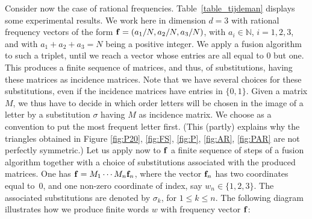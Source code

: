 \documentclass[preliminary,copyright,creativecommons]{eptcs}
\begin{document}
Consider now the case of  rational frequencies.  Table~\ref{table_tijdeman} displays  some experimental results.  We work here in dimension $d=3$
with  rational  frequency vectors of the form ${\bf f}=(a_1/N,a_2/N,a_3/N)$, with $a_i \in  \mathbb{N}$, $i=1,2,3$, and with  $a_1+a_2+a_3=N $ being a positive integer.  
We apply  a  fusion algorithm  to  such a triplet, until we reach   a vector whose entries are all equal to $0$ but one. This produces a  finite sequence of matrices, and thus, of   substitutions, having these  matrices  as  incidence matrices. Note that we have several choices for these substitutions, even  if 
the incidence matrices have  entries in $\{0,1\}$.  Given a matrix $M$, we  thus have to  decide in which order  letters will be   chosen in the image of a  letter by  a substitution $\sigma$ having 
$M$ as incidence matrix. We choose  as a convention    to  put  the most frequent  letter first.  (This  (partly) explains why the triangles  obtained in Figure  \ref{fig:P20}, \ref{fig:FS},  \ref{fig:P}, \ref{fig:AR}, \ref{fig:PAR} are not  perfectly symmetric.)
Let us apply  now to ${\bf f}$ a finite  sequence of   steps  of a fusion algorithm 
together with a choice  of  substitutions associated with the produced matrices. One has
$
{\bf f }= M_1 \cdots M_n {\bf f }_n
$,
where  the vector ${\bf f}_n $  has  two coordinates equal to~$0$, and  one non-zero coordinate of index, say 
$w_n \in \{1,2,3\}$. The associated   substitutions  are denoted by $\sigma_k$, for $1 \leq k \leq n$.  The following  diagram  illustrates how we produce
finite words $w$ with frequency  vector  ${\bf f}$:




\begin{center}
\end{center}  
\end{document}
